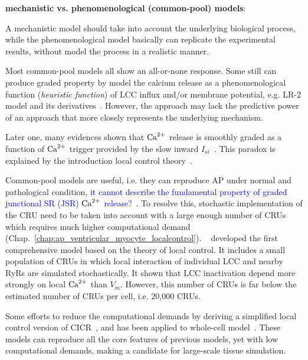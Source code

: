 \begin{framed}
  {\bf mechanistic vs. phenomenological (common-pool) models}:

  A mechanistic model should take into account the underlying
  biological process, while the phenomenological model basically can
  replicate the experimental results, without model the process in a
  realistic manner.

  Most common-pool models all show an all-or-none response. Some still
  can produce graded property by model the calcium release as a
  phenomenological function ({\it heuristic function}) of LCC influx
  and/or membrane potential, e.g. LR-2 model\citep{luo1994dmc_a} and
  its
  derivatives~\citep{fox2002,bondarenko2004cma,tenTusscher2004,hund2004,
    mahajan2008}.
  However, the approach may lack the predictive power of an approach
  that more closely represents the underlying mechanism.

  Later one, many evidences shown that ${\text{Ca}^{2+}}$ release is smoothly
  graded as a function of ${\text{Ca}^{2+}}$ trigger provided by the slow inward
  $I_{si}$~\citep{cannell1987,beuckelmann1988}.  This paradox is
  explained by the introduction local control
  theory~\citep{stern1992tec}.
\end{framed}

Common-pool models are useful, i.e. they can reproduce AP under normal and
pathological condition, \textcolor{blue}{it cannot describe the fundamental
property of graded
  junctional SR (JSR) ${\text{Ca}^{2+}}$ release?}~\citep{winslow2005mmc}.
To resolve this, stochastic implementation of the CRU need to be taken into
account with a large enough number of CRUs which requires much higher
computational demand (Chap.~\ref{chap:ap_ventricular_myocyte_localcontrol}).
~\citep{greenstein2002} developed the first comprehensive model based on the
theory of local control. It includes a small population of CRUs in which local
interaction of individual LCC and nearby RyRs are simulated stochastically. It
shown that LCC inactivation depend more strongly on local ${\text{Ca}^{2+}}$ than $V_m$.
However, this number of CRUs is far below the estimated number of CRUs per cell,
i.e. 20,000 CRUs.

Some efforts to reduce the computational demands by deriving a
simplified local control version of CICR~\citep{hinch2004slc}, and has
been applied to whole-cell model~\citep{tanskanen2006,
  greenstein2006}.  These models can reproduce all the core features
of previous models, yet with low computational demands, making a
candidate for large-scale tissue simulation. 

